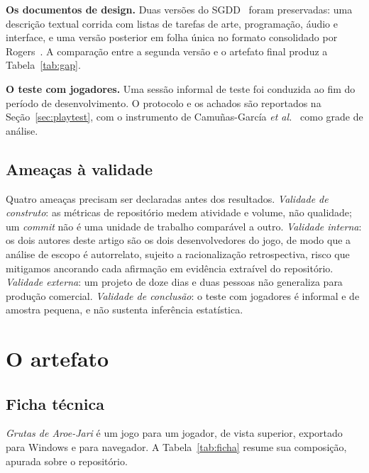\documentclass[conference]{IEEEtran}
\begin{document}
\textbf{Os documentos de design.} Duas versões do SGDD~\cite{sgdd2026} foram
preservadas: uma descrição textual corrida com listas de tarefas de arte, programação,
áudio e interface, e uma versão posterior em folha única no formato consolidado por
Rogers~\cite{rogers2014}. A comparação entre a segunda versão e o artefato final produz
a Tabela~\ref{tab:gap}.

\textbf{O teste com jogadores.} Uma sessão informal de teste foi conduzida ao fim do
período de desenvolvimento. O protocolo e os achados são reportados na
Seção~\ref{sec:playtest}, com o instrumento de Camuñas-García
\textit{et al.}~\cite{camunas2023} como grade de análise.

\subsection{Ameaças à validade}

Quatro ameaças precisam ser declaradas antes dos resultados. \textit{Validade de
construto}: as métricas de repositório medem atividade e volume, não qualidade; um
\textit{commit} não é uma unidade de trabalho comparável a outro. \textit{Validade
interna}: os dois autores deste artigo são os dois desenvolvedores do jogo, de modo que
a análise de escopo é autorrelato, sujeito a racionalização retrospectiva, risco que
mitigamos ancorando cada afirmação em evidência extraível do repositório.
\textit{Validade externa}: um projeto de doze dias e duas pessoas não generaliza para
produção comercial. \textit{Validade de conclusão}: o teste com jogadores é informal e
de amostra pequena, e não sustenta inferência estatística.

\section{O artefato}
\label{sec:artefato}

\subsection{Ficha técnica}

\textit{Grutas de Aroe-Jari} é um jogo para um jogador, de vista superior, exportado
para Windows e para navegador. A Tabela~\ref{tab:ficha} resume sua composição, apurada
sobre o repositório.
\end{document}
